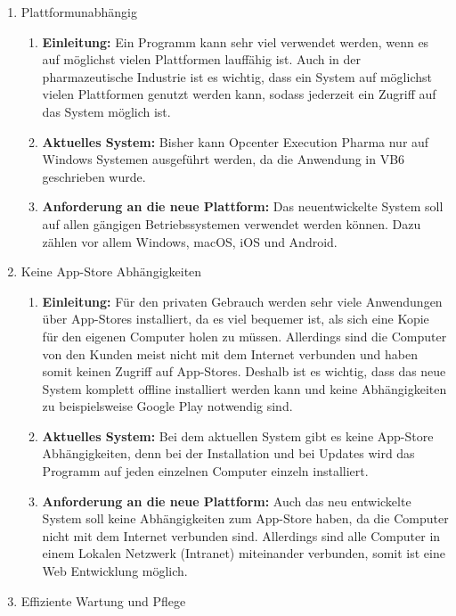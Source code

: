 \documentclass[ngerman]{article}
\begin{document}
    \begin{enumerate}
        \item Plattformunabhängig
        \begin{enumerate}[label=]
            \item \textbf{Einleitung:} Ein Programm kann sehr viel verwendet werden, wenn es auf möglichst vielen Plattformen lauffähig ist. Auch in der pharmazeutische Industrie ist es wichtig, dass ein System auf möglichst vielen Plattformen genutzt werden kann, sodass jederzeit ein Zugriff auf das System möglich ist.
            \item \textbf{Aktuelles System:} Bisher kann Opcenter Execution Pharma nur auf Windows Systemen ausgeführt werden, da die Anwendung in VB6 geschrieben wurde.
            \item \textbf{Anforderung an die neue Plattform:} Das neuentwickelte System soll auf allen gängigen Betriebssystemen verwendet werden können. Dazu zählen vor allem Windows, macOS, iOS und Android.
        \end{enumerate}
        \item Keine App-Store Abhängigkeiten
        \begin{enumerate}[label=]
            \item \textbf{Einleitung:} Für den privaten Gebrauch werden sehr viele Anwendungen über App-Stores installiert, da es viel bequemer ist, als sich eine Kopie für den eigenen Computer holen zu müssen. Allerdings sind die Computer von den Kunden meist nicht mit dem Internet verbunden und haben somit keinen Zugriff auf App-Stores. Deshalb ist es wichtig, dass das neue System komplett offline installiert werden kann und keine Abhängigkeiten zu beispielsweise Google Play notwendig sind.
            \item \textbf{Aktuelles System:} Bei dem aktuellen System gibt es keine App-Store Abhängigkeiten, denn bei der Installation und bei Updates wird das Programm auf jeden einzelnen Computer einzeln installiert.\\
            \item \textbf{Anforderung an die neue Plattform:} Auch das neu entwickelte System soll keine Abhängigkeiten zum App-Store haben, da die Computer nicht mit dem Internet verbunden sind. Allerdings sind alle Computer in einem Lokalen Netzwerk (Intranet) miteinander verbunden, somit ist eine Web Entwicklung möglich.
        \end{enumerate}
        \item Effiziente Wartung und Pflege

\end{enumerate}
\end{document}
